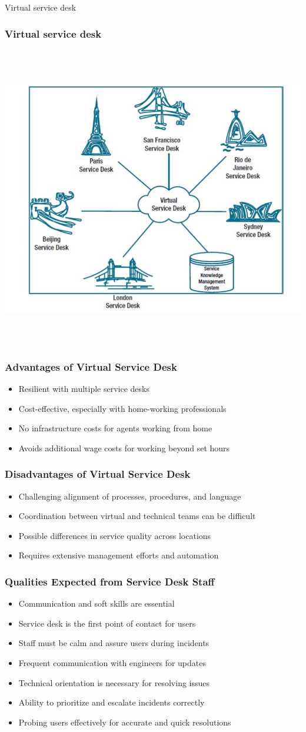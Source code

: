 \documentclass[aspectratio=169, table]{beamer}
\begin{document}
\begin{frame}{Virtual service desk} 	 \frametitle{Virtual service desk} \begin{center} 	\includegraphics[width=0.5\linewidth]{images/image-04.png} \end{center} \end{frame}

\begin{frame}
	\frametitle{Advantages of Virtual Service Desk}
	\begin{itemize}
		\item Resilient with multiple service desks
		\item Cost-effective, especially with home-working professionals
		\item No infrastructure costs for agents working from home
		\item Avoids additional wage costs for working beyond set hours
	\end{itemize}
\end{frame}

\begin{frame}
	\frametitle{Disadvantages of Virtual Service Desk}
	\begin{itemize}
		\item Challenging alignment of processes, procedures, and language
		\item Coordination between virtual and technical teams can be difficult
		\item Possible differences in service quality across locations
		\item Requires extensive management efforts and automation
	\end{itemize}
\end{frame}

\begin{frame}
	\frametitle{Qualities Expected from Service Desk Staff}
	\begin{itemize}
		\item Communication and soft skills are essential
		\item Service desk is the first point of contact for users
		\item Staff must be calm and assure users during incidents
		\item Frequent communication with engineers for updates
		\item Technical orientation is necessary for resolving issues
		\item Ability to prioritize and escalate incidents correctly
		\item Probing users effectively for accurate and quick resolutions
	\end{itemize}
\end{frame}
\end{document}
